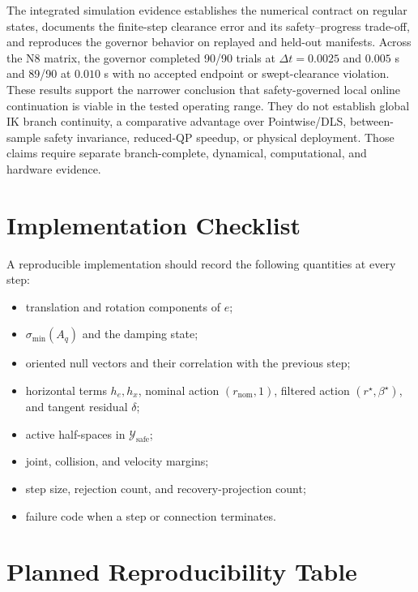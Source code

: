 \documentclass[preprint,12pt]{elsarticle}
\begin{document}
The integrated simulation evidence establishes the numerical contract on regular states, documents the finite-step clearance error and its safety--progress trade-off, and reproduces the governor behavior on replayed and held-out manifests. Across the N8 matrix, the governor completed 90/90 trials at $\Delta t=0.0025$ and $0.005$ s and 89/90 at $0.010$ s with no accepted endpoint or swept-clearance violation. These results support the narrower conclusion that safety-governed local online continuation is viable in the tested operating range. They do not establish global IK branch continuity, a comparative advantage over Pointwise/DLS, between-sample safety invariance, reduced-QP speedup, or physical deployment. Those claims require separate branch-complete, dynamical, computational, and hardware evidence.

\appendix

\section{Implementation Checklist}
\label{app:checklist}

A reproducible implementation should record the following quantities at every step:
\begin{itemize}
    \item translation and rotation components of $e$;
    \item $\sigma_{\min}(A_q)$ and the damping state;
    \item oriented null vectors and their correlation with the previous step;
    \item horizontal terms $h_e,h_x$, nominal action $(r_{\mathrm{nom}},1)$, filtered action $(r^\star,\beta^\star)$, and tangent residual $\delta$;
    \item active half-spaces in $\mathcal Y_{\mathrm{safe}}$;
    \item joint, collision, and velocity margins;
    \item step size, rejection count, and recovery-projection count;
    \item failure code when a step or connection terminates.
\end{itemize}

\section{Planned Reproducibility Table}
\end{document}

